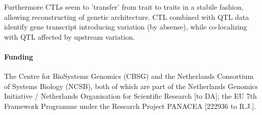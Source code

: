 \documentclass{bioinfo}
\begin{document}
  Furthermore CTLs seem to 'transfer' from trait to traits in a stabile 
  fashion, allowing reconstructing of genetic architecture. CTL combined with QTL 
  data identify gene transcript introducing variation (by absense), while co-localizing 
  with QTL affected by upstream variation.

\paragraph{Funding\textcolon}
The Centre for BioSystems Genomics (CBSG) and the Netherlands Consortium of Systems 
Biology (NCSB), both of which are part of the Netherlands Genomics Initiative / 
Netherlands Organisation for Scientiﬁc Research [to DA]; the EU 7th Framework 
Programme under the Research Project PANACEA [222936 to R.J.].
\vspace{-0.7cm}


\end{document}
